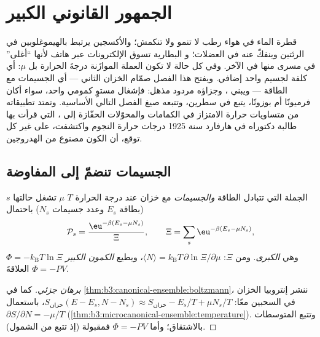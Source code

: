 \chapter{الجمهور القانوني الكبير}\label{ch:b3:grand-canonical}

قطرة الماء في هواء رطب لا تنمو ولا تنكمش؛ والأكسجين
يرتبط بالهيموغلوبين في الرئتين وينفكّ عنه في العضلات؛ و
البطارية تسوق الإلكترونات عبر هاتف لأنها ``أغلى''
في مسرى منها في الآخر. وفي كل حالة لا تكون العملة
الموازَنة درجةَ الحرارة بل \emph{} $\mu$: أي كلفة  لجسيم واحد إضافي. ويفتح
هذا الفصل صمّام الخزان الثاني --- أي الجسيمات مع
الطاقة --- ويبني ، وجزاؤه
مردود مذهل: فإشغال مستوٍ كمومي واحد،
سواء أكان فرميونًا أم بوزونًا، يتبع في سطرين، وتتبعه
صيغ الفصل التالي الأساسية. وتمتد تطبيقاته من
متساويات حرارة الامتزاز في الكمامات والمحوّلات الحفّازة إلى
، التي قرأت بها طالبة دكتوراه في هارفارد سنة 1925
درجات حرارة النجوم واكتشفت، على غير كل
توقع، أن الكون مصنوع من الهدروجين.

\section{الجسيمات تنضمّ إلى المفاوضة}

\begin{theorem}\label{thm:b3:grand-canonical:distribution}
الجملة التي تتبادل الطاقة \emph{والجسيمات} مع خزان عند
درجة الحرارة $T$  $\mu$ تشغل حالتها $s$
(بطاقة $E_s$ وعدد جسيمات $N_s$) باحتمال
\[
\mathcal P_s = \frac{\eu^{-\beta(E_s - \mu N_s)}}{\Xi} , \qquad
\Xi = \sum_s\eu^{-\beta(E_s - \mu N_s)} ,
\]
وهي \emph{ الكبرى}. ومن $\Xi$: $\langle N\rangle
= k_{\text{B}}T\,\partial\ln\Xi/\partial\mu$، ويطيع \emph{الكمون
الكبير} $\Phi = -k_{\text{B}}T\ln\Xi$ العلاقةَ $\Phi = -PV$.
\end{theorem}

\begin{proof}[برهان جزئي]
كما في \cref{thm:b3:canonical-ensemble:boltzmann}، ننشر
إنتروبيا الخزان في السحبين معًا:
$S_{\text{خزان}}(E - E_s, N - N_s) \approx S_{\text{خزان}} - E_s/T +
\mu N_s/T$، باستعمال $\partial S/\partial N = -\mu/T$
(\cref{thm:b3:microcanonical-ensemble:temperature}). وتتبع
المتوسطات بالاشتقاق؛ وأما $\Phi = -PV$ فمقبولة (إذ تتبع
من الشمول).
\end{proof}

